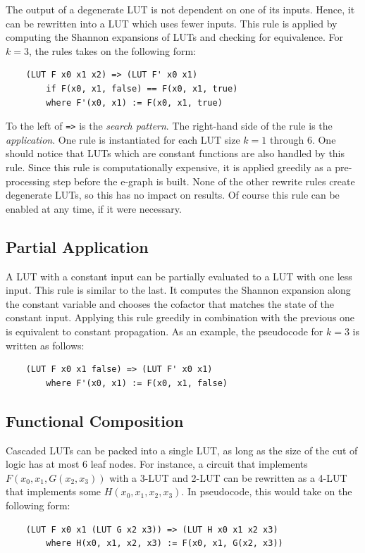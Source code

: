 The output of a degenerate LUT is not dependent on one of its inputs. Hence, it
can be rewritten into a LUT which uses fewer inputs. This rule is applied by
computing the Shannon expansions of LUTs and checking for equivalence. For
$k=3$, the rules takes on the following form:

\begin{verbatim}
    (LUT F x0 x1 x2) => (LUT F' x0 x1)
        if F(x0, x1, false) == F(x0, x1, true)
        where F'(x0, x1) := F(x0, x1, true)
\end{verbatim}

To the left of \texttt{=>} is the \textit{search pattern}. The right-hand side
of the rule is the \textit{application}. One rule is instantiated for each LUT
size $k =1$ through 6. One should notice that LUTs which are constant functions
are also handled by this rule. Since this rule is computationally expensive, it
is applied greedily as a pre-processing step before the e-graph is built. None
of the other rewrite rules create degenerate LUTs, so this has no impact on
results. Of course this rule can be enabled at any time, if it were necessary.

\subsection{Partial Application}\label{sec:rewrites:application}
A LUT with a constant input can be partially evaluated to a LUT with one less
input. This rule is similar to the last. It computes the Shannon expansion
along the constant variable and chooses the cofactor that matches the state of
the constant input. Applying this rule greedily in combination with the
previous one is equivalent to constant propagation. As an example, the
pseudocode for $k=3$ is written as follows:

\begin{verbatim}
    (LUT F x0 x1 false) => (LUT F' x0 x1)
        where F'(x0, x1) := F(x0, x1, false)
\end{verbatim}

\subsection{Functional Composition}\label{sec:rewrites:composition}

Cascaded LUTs can be packed into a single LUT, as long as the size of the cut
of logic has at most 6 leaf nodes. For instance, a circuit that implements
$F(x_0, x_1, G(x_2, x_3))$ with a 3-LUT and 2-LUT can be rewritten as a 4-LUT
that implements some $H(x_0, x_1, x_2, x_3)$. In pseudocode, this would take on
the following form:
\begin{verbatim}
    (LUT F x0 x1 (LUT G x2 x3)) => (LUT H x0 x1 x2 x3)
        where H(x0, x1, x2, x3) := F(x0, x1, G(x2, x3))
\end{verbatim}


